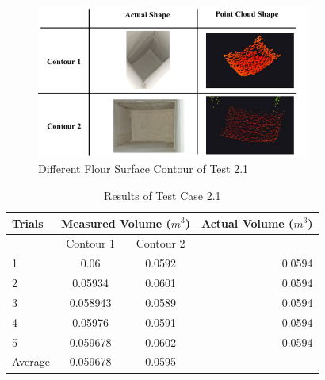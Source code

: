 \begin{figure}[H]
	\centering
	\includegraphics[width=0.8\textwidth]{Figures/test_2-1_contours}
	\caption{Different Flour Surface Contour of Test 2.1}
	\label{ch4:fig:test_2-1_contours}
\end{figure}

\begin{table}[H]
	\centering
	\caption{Results of Test Case 2.1}
	\label{table:test_case_1_results}
	\begin{tabular}{l c c r}
		\toprule
		\textbf{Trials} & \multicolumn{2}{c}{\textbf{Measured Volume ($m^{3}$)}} & \textbf{Actual Volume} ($m^{3}$)          \\ \midrule
		{}              & Contour 1                                              & Contour 2                        & {}     \\ 
		1               & 0.06                                                   & 0.0592                           & 0.0594 \\
		2               & 0.05934                                                & 0.0601                           & 0.0594 \\
		3               & 0.058943                                               & 0.0589                           & 0.0594 \\
		4               & 0.05976                                                & 0.0591                           & 0.0594 \\
		5               & 0.059678                                               & 0.0602                           & 0.0594 \\ \midrule
		Average         & 0.059678                                               & 0.0595                           & {}     \\ \bottomrule
	\end{tabular}
\end{table}

